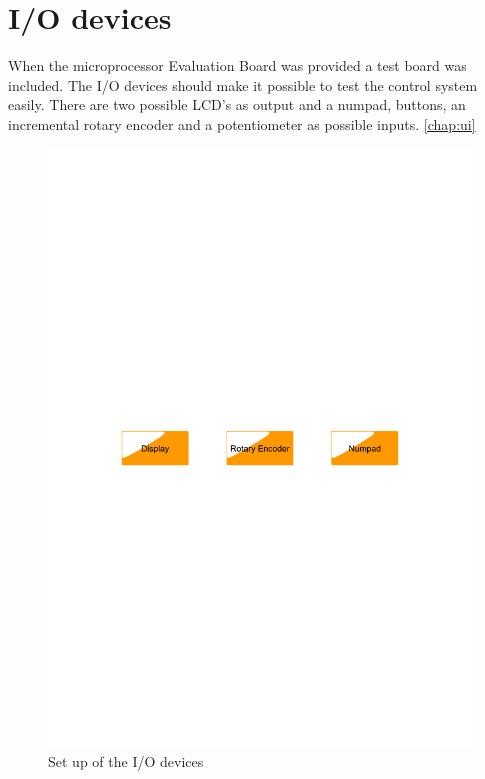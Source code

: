 \section{I/O devices}\label{sec:iodevices}

When the microprocessor Evaluation Board was provided a test board was included. The I/O devices should make it possible to test the control system easily. There are two possible LCD's as output and a numpad, buttons, an incremental rotary encoder and a potentiometer as possible inputs. \ref{chap:ui}
\begin{figure}[htb]
	\centering
	\includegraphics[scale=0.5,clip,trim=00 400 00 400]{graphics/iodevices} %
	\caption{Set up of the I/O devices}
	\label{fig:iodevices}			%
\end{figure}


